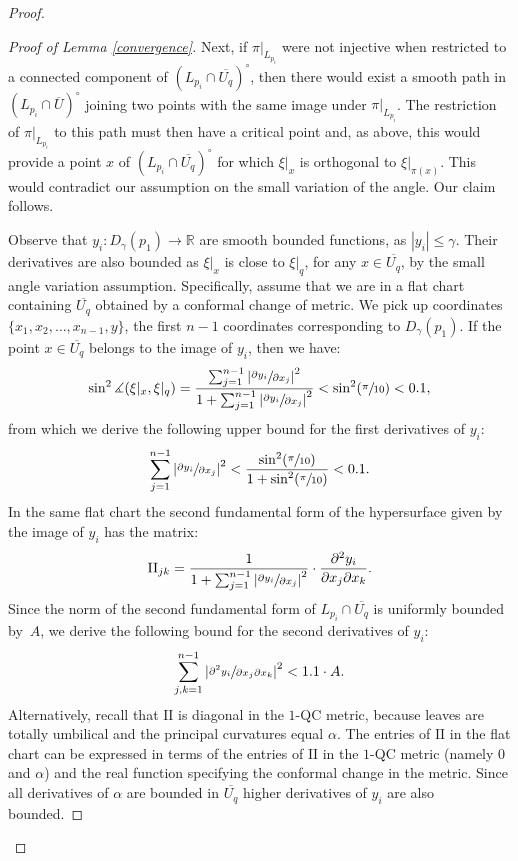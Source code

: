 \documentclass[10pt]{amsart}
\newcommand{\II}{\mathrm{II}}
\newcommand{\Psfrac}[2]{(\sfrac{#1}{#2})}
\theoremstyle{definition}
\theoremstyle{remark}
\numberwithin{equation}{section}
\newcommand{\RR}{\mathbb R}
\begin{document}
\begin{proof}
\begin{proof}[Proof of Lemma \ref{convergence}]
Next, if $\pi|_{L_{p_i}}$ were not injective when restricted to a connected component of $(L_{p_i}\cap \overline{U_q})^{\circ}$,
then there would exist a smooth path in $(L_{p_i}\cap \overline{U})^{\circ}$ joining two points with the same image under $\pi|_{L_{p_i}}$. The restriction of $\pi|_{L_{p_i}}$ to this path must then have a critical point and, as above, this would provide a
point $x$ of $(L_{p_i}\cap \overline{U_q})^{\circ}$ for which $\xi|_x$ is orthogonal to $\xi|_{\pi(x)}$. This would contradict
our assumption on the small variation of the angle. Our claim follows.

Observe that $y_i:D_{\gamma}(p_1)\to \RR$ are smooth bounded functions, as $ |y_i|\leq \gamma$.
Their derivatives are also bounded as $\xi|_{x}$ is close
to $\xi|_{q}$, for any $x\in \overline{U_q}$, by the small angle variation assumption.
Specifically, assume that we are in a flat chart containing $\overline{U_q}$ \hbox{obtained} by a conformal change of metric.
We pick up coordinates $\{x_1,x_2, \ldots,x_{n-1},y\}$, the first $n-1$ coordinates corresponding to $D_{\gamma}(p_1)$.
If the point $x\in \overline{U_q}$ belongs to the image of $y_i$, then we have:
\[ \sin^2\measuredangle(\xi|_{x},\xi|_{q})=\frac{\sum_{j=1}^{n-1}\left| \sfrac{\partial y_i}{\partial x_j}\right|^2}
{1+\sum_{j=1}^{n-1}\left| \sfrac{\partial y_i}{\partial x_j}\right|^2} <\sin^2\Psfrac{\pi}{10} < 0.1,\]
from which we derive the following upper bound for the first derivatives of $y_i$:
\[ \sum_{j=1}^{n-1}\left| \sfrac{\partial y_i}{\partial x_j}\right|^2 < \frac{\sin^2\Psfrac{\pi}{10}}{1+ \sin^2\Psfrac{\pi}{10}}<0.1.\]
In the same flat chart the second fundamental form of the hypersurface given by the image of $y_i$ has the matrix:
\[ \II_{jk}= \frac{1}{1+\sum_{j=1}^{n-1}\left| \sfrac{\partial y_i}{\partial x_j}\right|^2}\cdot \frac{\partial^2 y_i}{\partial x_j \partial x_k}.\]
Since the norm of the second fundamental form of $L_{p_i}\cap \overline{U_q}$ is uniformly bounded by~$A$, we derive the following bound for the second derivatives of $y_i$:\vspace*{-3pt}\enlargethispage{.5\baselineskip}%
\[ \sum_{j,k=1}^{n-1}\left| \sfrac{\partial^2 y_i}{\partial x_j\partial x_k}\right|^2 < 1.1\cdot A.\]
Alternatively, recall that $\II$ is diagonal in the $1$-QC metric, because leaves are totally umbilical and the principal curvatures
equal $\alpha$. The entries of $\II$ in the flat chart can be expressed in terms of the entries of $\II$ in the $1$-QC metric (namely $0$ and $\alpha$) and the real function specifying the conformal change in the metric. Since all derivatives of $\alpha$ are bounded in $\overline{U_q}$ higher derivatives of $y_i$ are also bounded.


\end{proof}
\end{proof}
\end{document}

